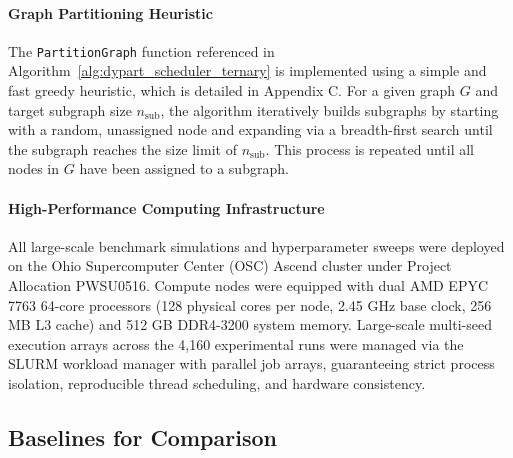 \documentclass[pdflatex,sn-mathphys-num]{sn-jnl}
\theoremstyle{thmstyleone}
\theoremstyle{thmstyletwo}%
\theoremstyle{thmstylethree}%
\begin{document}
\paragraph{Graph Partitioning Heuristic} The \texttt{PartitionGraph} function referenced in Algorithm~\ref{alg:dypart_scheduler_ternary} is implemented using a simple and fast greedy heuristic, which is detailed in Appendix C. For a given graph $G$ and target subgraph size $n_{\text{sub}}$, the algorithm iteratively builds subgraphs by starting with a random, unassigned node and expanding via a breadth-first search until the subgraph reaches the size limit of $n_{\text{sub}}$. This process is repeated until all nodes in $G$ have been assigned to a subgraph.

\paragraph{High-Performance Computing Infrastructure} All large-scale benchmark simulations and hyperparameter sweeps were deployed on the Ohio Supercomputer Center (OSC) Ascend cluster under Project Allocation PWSU0516. Compute nodes were equipped with dual AMD EPYC 7763 64-core processors (128 physical cores per node, 2.45 GHz base clock, 256 MB L3 cache) and 512 GB DDR4-3200 system memory. Large-scale multi-seed execution arrays across the 4,160 experimental runs were managed via the SLURM workload manager with parallel job arrays, guaranteeing strict process isolation, reproducible thread scheduling, and hardware consistency.


\subsection{Baselines for Comparison}
\end{document}
